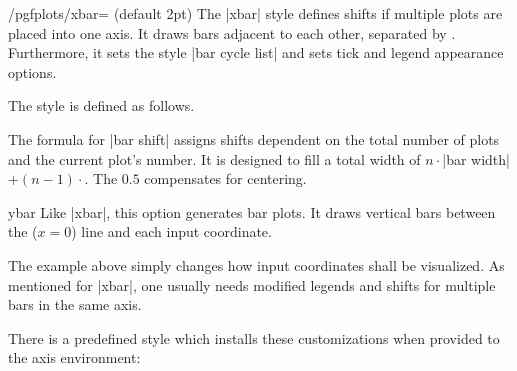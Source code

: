 {\begin{stylekey}{/pgfplots/xbar= (default 2pt)}
The |xbar| style defines shifts if multiple plots are placed into one axis. It draws bars adjacent to each other, separated by . Furthermore, it sets the style |bar cycle list| and sets tick and legend appearance options.

The style is defined as follows.
\begin{codeexample}
\end{codeexample}
The formula for |bar shift| assigns shifts dependent on the total number of plots and the current plot's number. It is designed to fill a total width of $n \cdot $|bar width|$ + (n-1) \cdot $. The $0.5$ compensates for centering.
\end{stylekey}

\begin{plottype}{ybar}
	Like |xbar|, this option generates bar plots. It draws vertical bars between the ($x=0$) line and each input coordinate.
\begin{codeexample}[]
\end{codeexample}
	The example above simply changes how input coordinates shall be visualized. As mentioned for |xbar|, one usually needs modified legends and shifts for multiple bars in the same axis.

	There is a predefined style which installs these customizations when provided to the axis environment:
\begin{codeexample}[]
\end{codeexample}
\end{plottype}}
